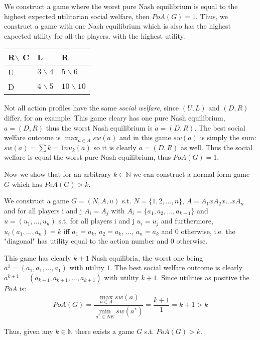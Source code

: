 \documentclass[12pt]{article}
\newcommand{\N}{\mathbb{N}}
\newenvironment{answer}[2][Answer]{\begin{trivlist}
\item[\hskip \labelsep {\bfseries #1}\hskip \labelsep {\bfseries #2:}]}{\end{trivlist}}
\begin{document}
\begin{answer}{b)}
We construct a game where the worst pure Nash equilibrium is equal to the highest expected utilitarian social welfare, then $PoA(G)=1$. Thus, we construct a game with one Nash equilibrium which is also has the highest expected utility for all the players. with the highest utility.

\begin{table}[h]
    \begin{tabular}{|l|l|l|}
    \hline
    R$\backslash$ C & L            & R              \\ \hline
    U & $3\backslash 4$ & $5\backslash 6$   \\ \hline
    D & $4\backslash 5$ & $10\backslash 10$ \\ \hline
    \end{tabular}
\end{table}

Not all action profiles have the same \textit{social welfare}, since $(U,L)$ and $(D,R)$ differ, for an example.
This game cleary has one pure Nash equilibrium, $a=(D,R)$ thus the worst Nash equilibrium is $a=(D,R)$. The best social welfare outcome is $\max_{a \in A}sw(a)$ and in this game $sw(a)$ is simply the sum: $sw(a)=\sum{k=1}{n}{u_k(a)}$ so it is clearly $a=(D,R)$ as well. Thus the social welfare is equal the worst pure Nash equilibrium, thus $PoA(G)=1$.

\end{answer}
\begin{answer}{c)}
Now we show that for an arbitrary $k \in \N $ we can construct a normal-form game $G$ which has $PoA(G)>k$.

We construct a game $G=(N,A,u)$ s.t. $N=\{1,2, ..., n\}$, $A=A_1xA_2x...xA_n$ and for all players i and j $A_i=A_j$ with $A_i=\{a_1, a_2, ..., a_{k+1}\}$ and $u=(u_1, ..., u_n)$ s.t. for all players i and j $u_i=u_j$ and furthermore, $u_i(a_1, ..., a_n)=k$ iff $a_1=a_k$, $a_2=a_k$, ..., $a_n=a_k$ and 0 otherwise, i.e. the "diagonal" has utility equal to the action number and $0$ otherwise.

This game has clearly $k+1$ Nash equilibria, the worst one being $a^1=(a_1, a_1, ..., a_1)$ with utility $1$. The best social welfare outcome is clearly $a^{k+1}=(a_{k+1}, a_{k+1}, ..., a_{k+1})$ with utility $k+1$. Since utilities as positive the $PoA$ is: \\

$$PoA(G)=\frac{\max_{a \in A}sw(a)}{\min_{a^* \in NE }sw(a^*)}=\frac{k+1}{1}=k+1>k$$

Thus, given any $k \in \N$ there exists a game $G$ s.t. $PoA(G)>k$.
\end{answer}
\end{document}
